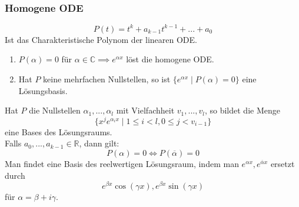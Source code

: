   \subsubsection{Homogene ODE}
      $$P(t)=t^k+a_{k-1}t^{k-1}+...+a_0$$
      Ist das Charakteristische Polynom der linearen ODE.
      \begin{enumerate}
        \item $P(\alpha)=0$ für $\alpha\in\mathbb C\implies e^{\alpha x}$ löst die
          homogene ODE.
        \item Hat $P$ keine mehrfachen Nullstellen, so ist $\{e^{\alpha x}\mid
          P(\alpha)=0\}$ eine Lösungsbasis.
      \end{enumerate}
      Hat $P$ die Nullstellen $\alpha_1,...,\alpha_l$ mit Vielfachheit
      $v_1,...,v_l$, so bildet die Menge $$\{x^je^{\alpha_i x}\mid 1\leq i<l,
      0\leq j<v_{i-1}\}$$ eine Bases des Lösungsraums.\\
      Falls $a_0,...,a_{k-1}\in\mathbb R$, dann gilt: $$P(\alpha)=0\iff
      P(\overline\alpha)=0$$ Man findet eine Basis des reelwertigen Lösungsraum,
      indem man $e^{\alpha x}, e^{\overline\alpha x}$ ersetzt durch $$e^{\beta
      x}\cos(\gamma x),e^{\beta x}\sin(\gamma x)$$ für $\alpha=\beta + i\gamma$.
